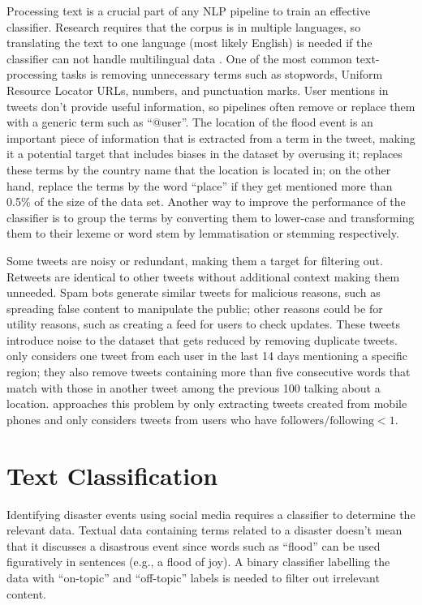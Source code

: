 Processing text is a crucial part of any \ac{NLP} pipeline to train an effective classifier.
Research requires that the corpus is in multiple languages, so translating the text to one language
(most likely English) is needed if the classifier can not handle multilingual data
\cite{singhEventClassificationLocation2019}. One of the most common text-processing tasks is
removing unnecessary terms such as stopwords, Uniform Resource Locator URLs, numbers, and
punctuation marks. User mentions in tweets don't provide useful information, so pipelines often
remove or replace them with a generic term such as
``@user''\cite{debruijnImprovingClassificationFlood2020}. The location of the flood event is an
important piece of information that is extracted from a term in the tweet, making it a potential
target that includes biases in the dataset by overusing it;
 replaces these terms by the country name that
the location is located in; on the other hand,
 replace the terms by the word ``place'' if
they get mentioned more than 0.5\% of the size of the data set. Another way to improve the
performance of the classifier is to group the terms by converting them to lower-case and
transforming them to their lexeme or word stem by lemmatisation or stemming respectively.

Some tweets are noisy or redundant, making them a target for filtering out. Retweets are identical
to other tweets without additional context making them unneeded. Spam bots generate similar tweets
for malicious reasons, such as spreading false content to manipulate the public; other reasons could
be for utility reasons, such as creating a feed for users to check updates. These tweets introduce
noise to the dataset that gets reduced by removing duplicate tweets.
 only considers one tweet from each user in the last
14 days mentioning a specific region; they also remove tweets containing more than five consecutive
words that match with those in another tweet among the previous 100 talking about a location.
 approaches this problem by only extracting tweets
created from mobile phones and only considers tweets from users who have $\text{followers} /
\text{following} < 1$.

\section{Text Classification}
Identifying disaster events using social media requires a classifier to determine the relevant data.
Textual data containing terms related to a disaster doesn't mean that it discusses a disastrous
event since words such as ``flood'' can be used figuratively in sentences (e.g., a flood of joy). A
binary classifier labelling the data with ``on-topic'' and ``off-topic'' labels is needed to filter
out irrelevant content.

